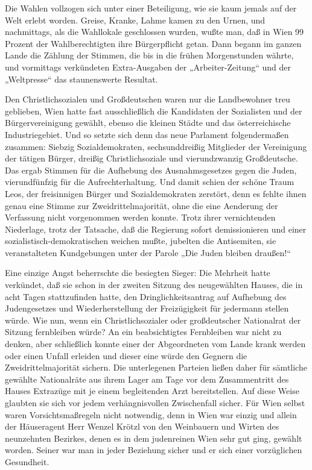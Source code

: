 \tb{* * *}
Die Wahlen vollzogen sich unter einer Beteiligung, wie sie kaum
jemals auf der Welt erlebt worden. Greise, Kranke, Lahme kamen zu
den Urnen, und nachmittags, als die Wahllokale geschlossen wurden,
wußte man, daß in Wien 99 Prozent der Wahlberechtigten ihre
Bürgerpflicht getan. Dann begann im ganzen Lande die Zählung der
Stimmen, die bis in die frühen Morgenstunden währte, und vormittags
verkündeten Extra-Ausgaben der „Arbeiter-Zeitung“ und der
„Weltpresse“ das staunenswerte Resultat.

Den Christlichsozialen und Großdeutschen waren nur die Landbewohner
treu geblieben, Wien hatte fast ausschließlich die Kandidaten der
Sozialisten und der Bürgervereinigung gewählt, ebenso die kleinen
Städte und das österreichische Industriegebiet. Und so setzte sich
denn das neue Parlament folgendermaßen zusammen: Siebzig
Sozialdemokraten, sechsunddreißig Mitglieder der Vereinigung der
tätigen Bürger, dreißig Christlichsoziale und vierundzwanzig
Großdeutsche. Das ergab  Stimmen für die
Aufhebung des Ausnahmsgesetzes gegen die Juden, vierundfünfzig für
die Aufrechterhaltung. Und damit schien der schöne Traum Leos, der
freisinnigen Bürger und Sozialdemokraten zerstört, denn es fehlte
ihnen genau eine Stimme zur Zweidrittelmajorität, ohne die eine
Aenderung der Verfassung nicht vorgenommen werden konnte. Trotz
ihrer vernichtenden Niederlage, trotz der Tatsache,  daß die Regierung sofort demissionieren und einer
sozialistisch-demokratischen weichen mußte, jubelten die
Antisemiten, sie veranstalteten Kundgebungen unter der Parole „Die
Juden bleiben draußen!“

Eine einzige Angst beherrschte die besiegten Sieger: Die Mehrheit
hatte verkündet, daß sie schon in der zweiten Sitzung des
neugewählten Hauses, die in acht Tagen stattzufinden hatte, den
Dringlichkeitsantrag auf Aufhebung des Judengesetzes und
Wiederherstellung der Freizügigkeit für jedermann stellen würde.
Wie nun, wenn ein Christlichsozialer oder großdeutscher Nationalrat
der Sitzung fernbleiben würde? An ein beabsichtigtes Fernbleiben
war nicht zu denken, aber schließlich konnte einer der Abgeordneten
vom Lande krank werden oder einen Unfall erleiden und dieser eine
würde den Gegnern die Zweidrittelmajorität sichern. Die
unterlegenen Parteien ließen daher für sämtliche gewählte
Nationalräte aus ihrem Lager am Tage vor dem Zusammentritt des
Hauses Extrazüge mit je einem begleitenden Arzt bereitstellen. Auf
diese Weise glaubten sie sich vor jedem verhängnisvollen
Zwischenfall sicher. Für Wien selbst waren Vorsichtsmaßregeln nicht
notwendig, denn in Wien war einzig und allein der Häuseragent Herr
Wenzel Krötzl von den Weinbauern und Wirten des neunzehnten
Bezirkes, denen es in dem judenreinen Wien sehr gut ging, gewählt
worden. Seiner war man in jeder Beziehung sicher und er
 sich einer vorzüglichen Gesundheit.

